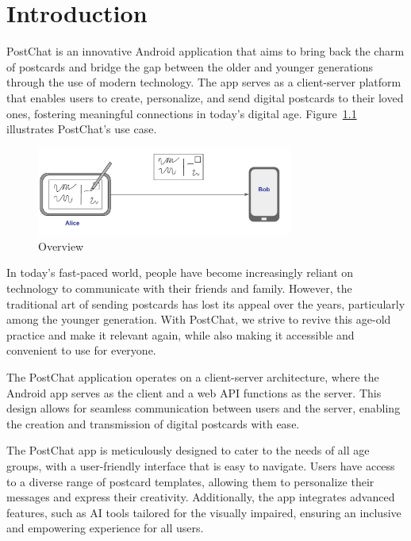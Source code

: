 
\chapter{Introduction} 
\label{ch:Chapter1}
\vfill \newpage
\noindent

PostChat is an innovative Android application that aims to bring back the charm of postcards and bridge the gap between the older and younger generations through the use of modern technology. The app serves as a client-server platform that enables users to create, personalize, and send digital postcards to their loved ones, fostering meaningful connections in today's digital age.
Figure~\ref{fig:OV} illustrates PostChat's use case.

\begin{figure}[!ht]
	\centering
	\includegraphics[width=0.75\textwidth]{./Chapter1/Figures/Overview}
	\caption{Overview}
	\label{fig:OV}
\end{figure}

In today's fast-paced world, people have become increasingly reliant on technology to communicate with their friends and family. However, the traditional art of sending postcards has lost its appeal over the years, particularly among the younger generation. With PostChat, we strive to revive this age-old practice and make it relevant again, while also making it accessible and convenient to use for everyone.

The PostChat application operates on a client-server architecture, where the Android app serves as the client and a web API functions as the server. This design allows for seamless communication between users and the server, enabling the creation and transmission of digital postcards with ease.

The PostChat app is meticulously designed to cater to the needs of all age groups, with a user-friendly interface that is easy to navigate. Users have access to a diverse range of postcard templates, allowing them to personalize their messages and express their creativity. Additionally, the app integrates advanced features, such as AI tools tailored for the visually impaired, ensuring an inclusive and empowering experience for all users.

